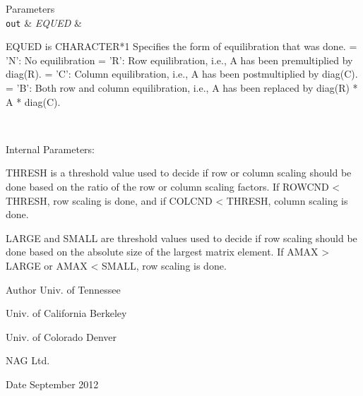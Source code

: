 \begin{DoxyParams}[1]{Parameters}
\\
\hline
\mbox{\tt out}  & {\em E\+Q\+U\+E\+D} & \begin{DoxyVerb}          EQUED is CHARACTER*1
          Specifies the form of equilibration that was done.
          = 'N':  No equilibration
          = 'R':  Row equilibration, i.e., A has been premultiplied by
                  diag(R).
          = 'C':  Column equilibration, i.e., A has been postmultiplied
                  by diag(C).
          = 'B':  Both row and column equilibration, i.e., A has been
                  replaced by diag(R) * A * diag(C).\end{DoxyVerb}
 \\
\hline
\end{DoxyParams}
\begin{DoxyParagraph}{Internal Parameters\+: }
\begin{DoxyVerb}  THRESH is a threshold value used to decide if row or column scaling
  should be done based on the ratio of the row or column scaling
  factors.  If ROWCND < THRESH, row scaling is done, and if
  COLCND < THRESH, column scaling is done.

  LARGE and SMALL are threshold values used to decide if row scaling
  should be done based on the absolute size of the largest matrix
  element.  If AMAX > LARGE or AMAX < SMALL, row scaling is done.\end{DoxyVerb}
 
\end{DoxyParagraph}
\begin{DoxyAuthor}{Author}
Univ. of Tennessee 

Univ. of California Berkeley 

Univ. of Colorado Denver 

N\+A\+G Ltd. 
\end{DoxyAuthor}
\begin{DoxyDate}{Date}
September 2012 
\end{DoxyDate}
\hypertarget{group__complex16GEauxiliary_ga9b8dc8981846f349260173092928b059}{}
